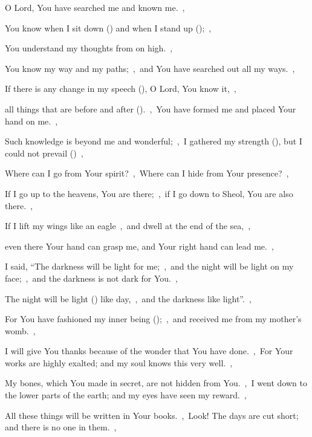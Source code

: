\documentclass[12pt,twoside,a5paper]{article}
\begin{document}
\begin{normalparskip}
  O Lord, You have searched me and known me.~\sep

  You know when I sit down () and when I stand up ();~\sep


  You understand my thoughts from on high.~\sep

  You know my way and my paths;~\sep\ and You have searched out all my ways.~\sep

  If there is any change in my speech (), O Lord, You know it,~\sep

  all things that are before and after ().~\sep\ You have formed me and placed Your hand on me.~\sep

  Such knowledge is beyond me and wonderful;~\sep\ I gathered my strength (), but I could not prevail ()~\sep

  Where can I go from Your spirit?~\sep\ Where can I hide from Your presence?~\sep

  If I go up to the heavens, You are there;~\sep\ if I go down to Sheol, You are also there.~\sep

  If I lift my wings like an eagle~\sep\ and dwell at the end of the sea,~\sep

  even there Your hand can grasp me, and Your right hand can lead me.~\sep

  I said, ``The darkness will be light for me;~\sep\ and the night will be light on my face;~\sep\ and the darkness is not dark for You.~\sep

  The night will be light () like day,~\sep\ and the darkness like light''.~\sep

  For You have fashioned my inner being ();~\sep\ and received me from my mother's womb.~\sep

  I will give You thanks because of the wonder that You have done.~\sep\ For Your works are highly exalted; and my soul knows this very well.~\sep

  My bones, which You made in secret, are not hidden from You.~\sep\ I went down to the lower parts of the earth; and my eyes have seen my reward.~\sep

  All these things will be written in Your books.~\sep\ Look! The days are cut short; and there is no one in them.~\sep


\end{normalparskip}
\end{document}
